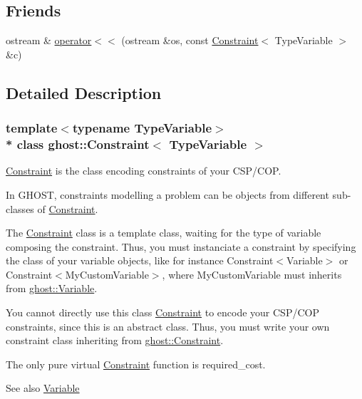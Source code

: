 \subsection*{Friends}
\begin{DoxyCompactItemize}
\item 
ostream \& \hyperlink{classghost_1_1Constraint_a5fa7c37883c5e8fc8dde355ecfe5f70d}{operator$<$$<$} (ostream \&os, const \hyperlink{classghost_1_1Constraint}{Constraint}$<$ Type\+Variable $>$ \&c)
\end{DoxyCompactItemize}


\subsection{Detailed Description}
\subsubsection*{template$<$typename Type\+Variable$>$\\*
class ghost\+::\+Constraint$<$ Type\+Variable $>$}

\hyperlink{classghost_1_1Constraint}{Constraint} is the class encoding constraints of your C\+S\+P/\+C\+OP. 

In G\+H\+O\+ST, constraints modelling a problem can be objects from different sub-\/classes of \hyperlink{classghost_1_1Constraint}{Constraint}.

The \hyperlink{classghost_1_1Constraint}{Constraint} class is a template class, waiting for the type of variable composing the constraint. Thus, you must instanciate a constraint by specifying the class of your variable objects, like for instance Constraint$<$\+Variable$>$ or Constraint$<$\+My\+Custom\+Variable$>$, where My\+Custom\+Variable must inherits from \hyperlink{classghost_1_1Variable}{ghost\+::\+Variable}.

You cannot directly use this class \hyperlink{classghost_1_1Constraint}{Constraint} to encode your C\+S\+P/\+C\+OP constraints, since this is an abstract class. Thus, you must write your own constraint class inheriting from \hyperlink{classghost_1_1Constraint}{ghost\+::\+Constraint}.

The only pure virtual \hyperlink{classghost_1_1Constraint}{Constraint} function is required\+\_\+cost.

\begin{DoxySeeAlso}{See also}
\hyperlink{classghost_1_1Variable}{Variable} 
\end{DoxySeeAlso}


